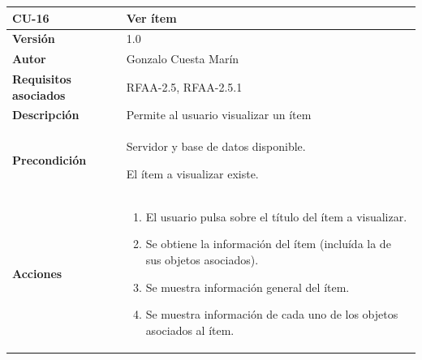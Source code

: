 \documentclass[
]{article}
\providecommand{\tightlist}{%
  \setlength{\itemsep}{0pt}\setlength{\parskip}{0pt}}
\begin{document}
\begin{longtable}[]{@{}ll@{}}
\toprule
\begin{minipage}[b]{0.24\columnwidth}\raggedright
\textbf{CU-16}\strut
\end{minipage} & \begin{minipage}[b]{0.70\columnwidth}\raggedright
\textbf{Ver ítem}\strut
\end{minipage}\tabularnewline
\midrule
\endhead
\begin{minipage}[t]{0.24\columnwidth}\raggedright
\textbf{Versión}\strut
\end{minipage} & \begin{minipage}[t]{0.70\columnwidth}\raggedright
1.0\strut
\end{minipage}\tabularnewline
\begin{minipage}[t]{0.24\columnwidth}\raggedright
\textbf{Autor}\strut
\end{minipage} & \begin{minipage}[t]{0.70\columnwidth}\raggedright
Gonzalo Cuesta Marín\strut
\end{minipage}\tabularnewline
\begin{minipage}[t]{0.24\columnwidth}\raggedright
\textbf{Requisitos asociados}\strut
\end{minipage} & \begin{minipage}[t]{0.70\columnwidth}\raggedright
RFAA-2.5, RFAA-2.5.1\strut
\end{minipage}\tabularnewline
\begin{minipage}[t]{0.24\columnwidth}\raggedright
\textbf{Descripción}\strut
\end{minipage} & \begin{minipage}[t]{0.70\columnwidth}\raggedright
Permite al usuario visualizar un ítem\strut
\end{minipage}\tabularnewline
\begin{minipage}[t]{0.24\columnwidth}\raggedright
\textbf{Precondición}\strut
\end{minipage} & \begin{minipage}[t]{0.70\columnwidth}\raggedright
Servidor y base de datos disponible.

El ítem a visualizar existe.\strut
\end{minipage}\tabularnewline
\begin{minipage}[t]{0.24\columnwidth}\raggedright
\textbf{Acciones}\strut
\end{minipage} & \begin{minipage}[t]{0.70\columnwidth}\raggedright
\begin{enumerate}
\def\labelenumi{\arabic{enumi}.}
\tightlist
\item
  El usuario pulsa sobre el título del ítem a visualizar.
\item
  Se obtiene la información del ítem (incluída la de sus objetos
  asociados).
\item
  Se muestra información general del ítem.
\item
  Se muestra información de cada uno de los objetos asociados al ítem.


\end{enumerate}
\end{minipage}
\end{longtable}
\end{document}
